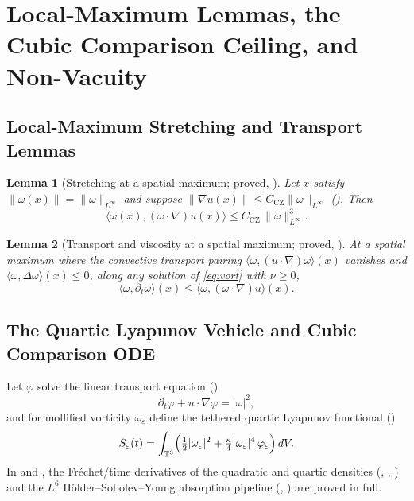 \documentclass[11pt,a4paper]{article}
\theoremstyle{plain}
\newtheorem{lemma}{Lemma}[section]
\theoremstyle{definition}
\theoremstyle{remark}
\newcommand{\T}{\mathbb{T}^3}
\newcommand{\CZ}{C_{\mathrm{CZ}}}
\begin{document}
\section{Local-Maximum Lemmas, the Cubic Comparison Ceiling, and Non-Vacuity}\label{sec:cubic}

\subsection{Local-Maximum Stretching and Transport Lemmas}
\begin{lemma}[Stretching at a spatial maximum; proved, ]\label{lem:localmax}
Let $x$ satisfy $\|\omega(x)\|=\|\omega\|_{L^\infty}$ and suppose $\|\nabla u(x)\|\le\CZ\|\omega\|_{L^\infty}$ (). Then
\[
\langle\omega(x),(\omega\cdot\nabla)u(x)\rangle\le\CZ\,\|\omega\|_{L^\infty}^3 .
\]
\end{lemma}

\begin{lemma}[Transport and viscosity at a spatial maximum; proved, ]\label{lem:transport}
At a spatial maximum where the convective transport pairing $\langle\omega,(u\cdot\nabla)\omega\rangle(x)$ vanishes and $\langle\omega,\Delta\omega\rangle(x)\le0$, along any solution of \eqref{eq:vort} with $\nu\ge0$,
\[
\langle\omega,\partial_t\omega\rangle(x)\le\langle\omega,(\omega\cdot\nabla)u\rangle(x).
\]
\end{lemma}

\subsection{The Quartic Lyapunov Vehicle and Cubic Comparison ODE}
Let $\varphi$ solve the linear transport equation ()
\begin{equation}\label{eq:phi}
\partial_t\varphi+u\cdot\nabla\varphi=|\omega|^2,
\end{equation}
and for mollified vorticity $\omega_\varepsilon$ define the tethered quartic Lyapunov functional ()
\begin{equation}\label{eq:S}
S_\varepsilon(t)=\int_{\T}\Bigl(\tfrac12|\omega_\varepsilon|^2+\tfrac{\kappa}{4}|\omega_\varepsilon|^4\,\varphi_\varepsilon\Bigr)\,dV .
\end{equation}
In  and , the Fréchet/time derivatives of the quadratic and quartic densities (, , ) and the $L^6$ Hölder--Sobolev--Young absorption pipeline (, ) are proved in full.
\end{document}
